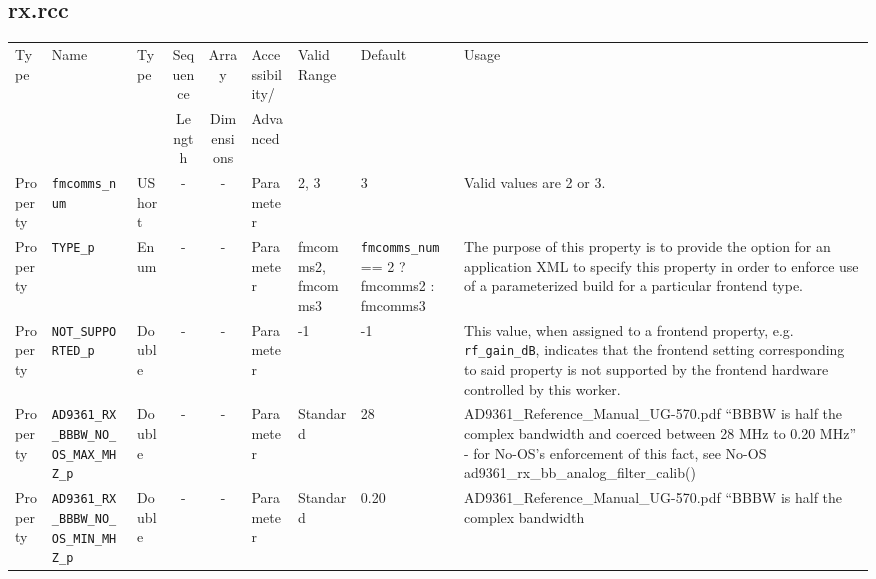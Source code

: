 \documentclass{article}
\def\comp{rx}
\begin{document}
\begin{landscape}
	\subsection*{\comp.rcc}
	\begin{scriptsize}
		\begin{longtable}{|p{1.8cm}|p{4.1cm}|p{1cm}|c|c|p{1.6cm}|p{3.7cm}|p{3.7cm}|p{2.5cm}|}
			\hline
			\rowcolor{blue}
			Type         & Name                                & Type & Sequence & Array      & Accessibility/ & Valid Range  & Default & Usage                                                                                                                                                                                                                       \\
			\rowcolor{blue}
			             &                                     &      & Length   & Dimensions & Advanced       &              &         &                                                                                                                                                                                                                             \\
			\hline
			Property     & \verb+fmcomms_num+                   & UShort &-        & -          & Parameter & 2, 3 & 3 & Valid values are 2 or 3.\\
			\hline
			Property     & \verb+TYPE_p+                   & Enum &-        & -          & Parameter & fmcomms2, fmcomms3 & \verb+fmcomms_num+ == 2 ? fmcomms2 : fmcomms3 & The purpose of this property is to provide the option for     an application XML to specify this property in order to enforce use of a parameterized build for a     particular frontend type.\\
			\hline
			Property     & \verb+NOT_SUPPORTED_p+                   & Double&-        & -          & Parameter & -1 & -1 & This value, when assigned to a frontend property, e.g. \verb+rf_gain_dB+, indicates that the frontend setting corresponding to said property is not supported by the frontend hardware controlled by this worker.
			 \\
			\hline
			Property     & \verb+AD9361_RX_BBBW_NO_OS_MAX_MHZ_p+ & Double & -       & -          & Parameter & Standard & 28 & AD9361\_Reference\_Manual\_UG-570.pdf ``BBBW is half the complex bandwidth
        and coerced between 28 MHz to 0.20 MHz'' - for No-OS's enforcement of
        this fact, see No-OS ad9361\_rx\_bb\_analog\_filter\_calib()  \\
			\hline
			Property     & \verb+AD9361_RX_BBBW_NO_OS_MIN_MHZ_p+ & Double & -       & -          & Parameter & Standard & 0.20 & AD9361\_Reference\_Manual\_UG-570.pdf ``BBBW is half the complex bandwidth

\end{longtable}
\end{scriptsize}
\end{landscape}
\end{document}
